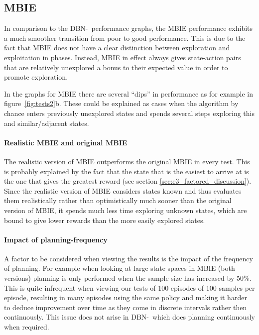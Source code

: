 \subsection{MBIE}
In comparison to the DBN-\etre\ performance graphs, the MBIE performance exhibits a much smoother transition from poor to good performance. This is due to the fact that MBIE does not have a clear distinction between exploration and exploitation in phases. Instead, MBIE in effect always gives state-action pairs that are relatively unexplored a bonus to their expected value in order to promote exploration.  

In the graphs for MBIE there are several ``dips'' in performance as for example in figure~\ref{fig:tests2}b. These could be explained as cases when the algorithm by chance enters previously unexplored states and spends several steps exploring this and similar/adjacent states. 

\paragraph{Realistic MBIE and original MBIE}
The realistic version of MBIE outperforms the original MBIE in every test. This is probably explained by the fact that the state that is the easiest to arrive at is the one that gives the greatest reward (see section \ref{sec:e3_factored_discussion}). Since the realistic version of MBIE considers states known and thus evaluates them  realistically rather than optimistically much sooner than the original version of MBIE, it spends much less time exploring unknown states, which are bound to give lower rewards than the more easily explored states. 

\paragraph{Impact of planning-frequency}
A factor to be considered when viewing the results is the impact of the frequency of planning. For example when looking at large state spaces in MBIE (both versions) planning is only performed when the sample size has increased by 50\%. This is quite infrequent when viewing our tests of 100 episodes of 100 samples per episode, resulting in many episodes using the same policy and making it harder to deduce improvement over time as they come in discrete intervals rather then continuously. This issue does not arise in DBN-\etre\ which does planning continuously when required.    


